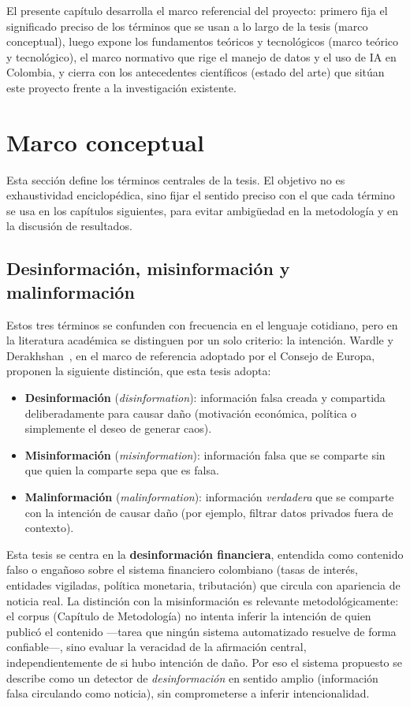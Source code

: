 El presente capítulo desarrolla el marco referencial del proyecto: primero fija el significado preciso de los términos que se usan a lo largo de la tesis (marco conceptual), luego expone los fundamentos teóricos y tecnológicos (marco teórico y tecnológico), el marco normativo que rige el manejo de datos y el uso de IA en Colombia, y cierra con los antecedentes científicos (estado del arte) que sitúan este proyecto frente a la investigación existente.

\section{Marco conceptual}

Esta sección define los términos centrales de la tesis. El objetivo no es exhaustividad enciclopédica, sino fijar el sentido preciso con el que cada término se usa en los capítulos siguientes, para evitar ambigüedad en la metodología y en la discusión de resultados.

\subsection{Desinformación, misinformación y malinformación}

Estos tres términos se confunden con frecuencia en el lenguaje cotidiano, pero en la literatura académica se distinguen por un solo criterio: la intención. Wardle y Derakhshan~\cite{WardleDerakhshan2017}, en el marco de referencia adoptado por el Consejo de Europa, proponen la siguiente distinción, que esta tesis adopta:

\begin{itemize}
    \item \textbf{Desinformación} (\textit{disinformation}): información falsa creada y compartida deliberadamente para causar daño (motivación económica, política o simplemente el deseo de generar caos).
    \item \textbf{Misinformación} (\textit{misinformation}): información falsa que se comparte sin que quien la comparte sepa que es falsa.
    \item \textbf{Malinformación} (\textit{malinformation}): información \emph{verdadera} que se comparte con la intención de causar daño (por ejemplo, filtrar datos privados fuera de contexto).
\end{itemize}

Esta tesis se centra en la \textbf{desinformación financiera}, entendida como contenido falso o engañoso sobre el sistema financiero colombiano (tasas de interés, entidades vigiladas, política monetaria, tributación) que circula con apariencia de noticia real. La distinción con la misinformación es relevante metodológicamente: el corpus (Capítulo de Metodología) no intenta inferir la intención de quien publicó el contenido —tarea que ningún sistema automatizado resuelve de forma confiable—, sino evaluar la veracidad de la afirmación central, independientemente de si hubo intención de daño. Por eso el sistema propuesto se describe como un detector de \emph{desinformación} en sentido amplio (información falsa circulando como noticia), sin comprometerse a inferir intencionalidad.

